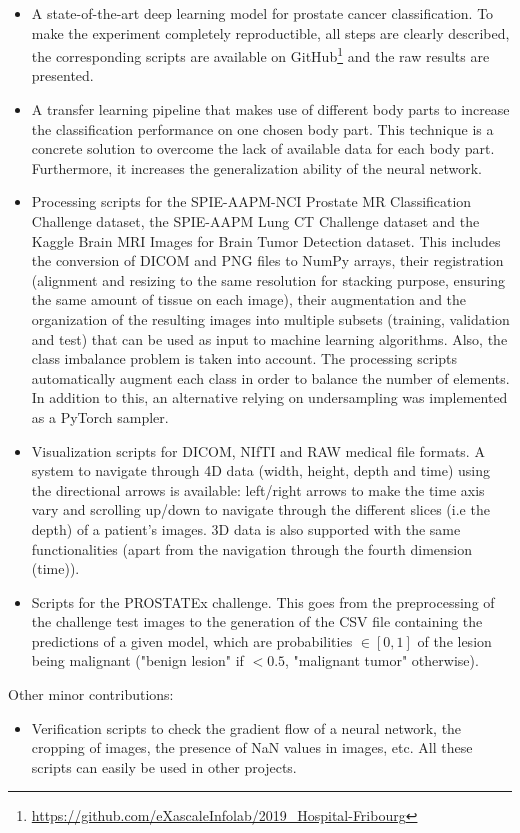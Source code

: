 \begin{itemize}
\item A state-of-the-art deep learning model for prostate cancer classification. To make the experiment completely reproductible, all steps are clearly described, the corresponding scripts are available on GitHub\footnote{\url{https://github.com/eXascaleInfolab/2019_Hospital-Fribourg}} and the raw results are presented. 

\item A transfer learning pipeline that makes use of different body parts to increase the classification performance on one chosen body part. This technique is a concrete solution to overcome the lack of available data for each body part. Furthermore, it increases the generalization ability of the neural network.

\item Processing scripts for the SPIE-AAPM-NCI Prostate MR Classification Challenge dataset, the SPIE-AAPM Lung CT Challenge dataset and the Kaggle Brain MRI Images for Brain Tumor Detection dataset. This includes the conversion of DICOM and PNG files to NumPy arrays, their registration (alignment and resizing to the same resolution for stacking purpose, ensuring the same amount of tissue on each image), their augmentation and the organization of the resulting images into multiple subsets (training, validation and test) that can be used as input to machine learning algorithms. Also, the class imbalance problem is taken into account. The processing scripts automatically augment each class in order to balance the number of elements. In addition to this, an alternative relying on undersampling was implemented as a PyTorch sampler.

\item Visualization scripts for DICOM, NIfTI and RAW medical file formats. A system to navigate through 4D data (width, height, depth and time) using the directional arrows is available: left/right arrows to make the time axis vary and scrolling up/down to navigate through the different slices (i.e the depth) of a patient's images. 3D data is also supported with the same functionalities (apart from the navigation through the fourth dimension (time)). 

\item Scripts for the PROSTATEx challenge. This goes from the preprocessing of the challenge test images to the generation of the CSV file containing the predictions of a given model, which are probabilities $\in [0,1]$ of the lesion being malignant ("benign lesion" if $< 0.5$, "malignant tumor" otherwise).

\end{itemize}
Other minor contributions:
\begin{itemize}
\item Verification scripts to check the gradient flow of a neural network, the cropping of images, the presence of NaN values in images, etc. All these scripts can easily be used in other projects.
\end{itemize}


